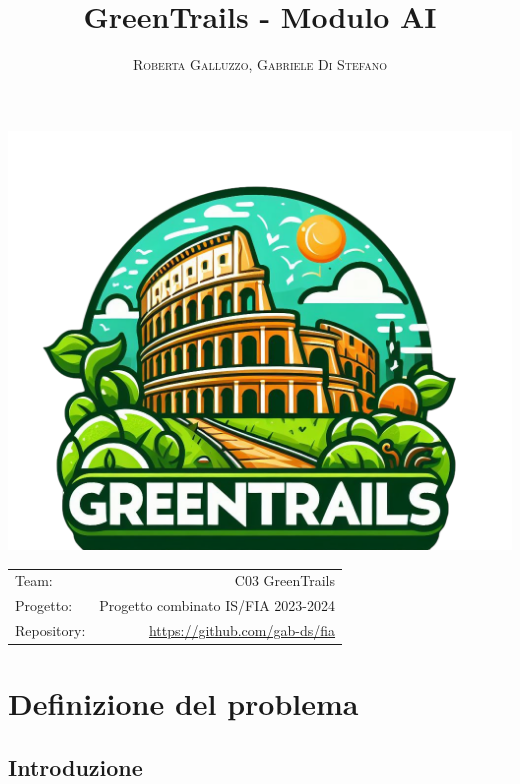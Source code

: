 \documentclass{CSUniSchoolLabReport}
\title{GreenTrails - Modulo AI}
\author{\textsc{Roberta Galluzzo}, \textsc{Gabriele Di Stefano}}
\begin{document}
\maketitle

\begin{center}
	\includegraphics[scale=0.2]{logo}
\end{center}

\begin{center}
	\begin{tabular}{l r}
		Team: & C03 GreenTrails \\
		Progetto: & Progetto combinato IS/FIA 2023-2024 \\
		Repository: & \href{https://github.com/gab-ds/fia}{https://github.com/gab-ds/fia}
	\end{tabular}
\end{center}

\pagebreak

\tableofcontents

\pagebreak

\section{Definizione del problema}
\subsection{Introduzione}
\end{document}

